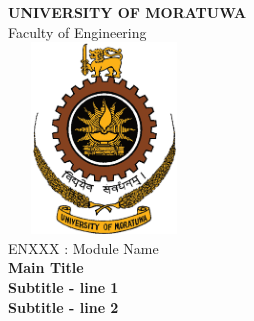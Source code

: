 \documentclass[12pt,a4paper,margin=1in]{article}
\begin{document}
\begin{titlepage}


\center %

\fontsize{16pt}{12}\selectfont \textbf{UNIVERSITY OF MORATUWA}\\[0.5cm] %
\fontsize{16pt}{12}\selectfont Faculty of Engineering\\[0.5cm] %

\includegraphics[width=2in,height=2in,keepaspectratio]{logo.png}\\[1cm] %


\fontsize{16pt}{12}\selectfont ENXXX : Module Name\\[0.5cm]
\fontsize{18pt}{12}\selectfont \textbf{Main Title}\\[1.5cm]
\fontsize{18pt}{12}\selectfont \textbf{Subtitle - line 1}\\[3pt] 
\fontsize{18pt}{12}\selectfont \textbf{Subtitle - line 2}\\[0.5cm]


\end{titlepage}
\end{document}
